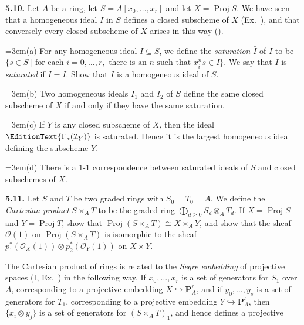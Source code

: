 {\smallskip
\noindent\hypertarget{ex-II-5.10}{}\textbf{5.10.} Let $A$ be a ring, let $S=A[x_0,\ldots,x_r]$ and let $X=\operatorname{Proj} S$. We have seen that a homogeneous ideal $I$ in $S$ defines a closed subscheme of $X$ (Ex.~), and that conversely every closed subscheme of $X$ arises in this way ().

\noindent\hangindent=3em\hspace*{1.7em}(a) For any homogeneous ideal $I\subseteq S$, we define the \emph{saturation} $\bar I$ of $I$ to be $\{s\in S\mid\text{for each }i=0,\ldots,r,\text{ there is an }n\text{ such that }x_i^ns\in I\}$. We say that $I$ is \emph{saturated} if $I=\bar I$. Show that $\bar I$ is a homogeneous ideal of $S$.

\noindent\hangindent=3em\hspace*{1.7em}(b) Two homogeneous ideals $I_1$ and $I_2$ of $S$ define the same closed subscheme of $X$ if and only if they have the same saturation.

\noindent\hangindent=3em\hspace*{1.7em}(c) If $Y$ is any closed subscheme of $X$, then the ideal $\EditionText{\Gamma_*(\mathcal I_Y)}$ is saturated. Hence it is the largest homogeneous ideal defining the subscheme $Y$.

\noindent\hangindent=3em\hspace*{1.7em}(d) There is a $1$-$1$ correspondence between saturated ideals of $S$ and closed subschemes of $X$.

\smallskip
\noindent\hypertarget{ex-II-5.11}{}\textbf{5.11.} Let $S$ and $T$ be two graded rings with $S_0=T_0=A$. We define the \emph{Cartesian product} $S\times_A T$ to be the graded ring $\bigoplus_{d\ge 0}S_d\otimes_A T_d$. If $X=\operatorname{Proj} S$ and $Y=\operatorname{Proj} T$, show that $\operatorname{Proj}(S\times_A T)\cong X\times_A Y$, and show that the sheaf $\mathcal O(1)$ on $\operatorname{Proj}(S\times_A T)$ is isomorphic to the sheaf $p_1^*(\mathcal O_X(1))\otimes p_2^*(\mathcal O_Y(1))$ on $X\times Y$.

The Cartesian product of rings is related to the \emph{Segre embedding} of projective spaces (I, Ex.~) in the following way. If $x_0,\ldots,x_r$ is a set of generators for $S_1$ over $A$, corresponding to a projective embedding $X\hookrightarrow\mathbf P_A^r$, and if $y_0,\ldots,y_s$ is a set of generators for $T_1$, corresponding to a projective embedding $Y\hookrightarrow\mathbf P_A^s$, then $\{x_i\otimes y_j\}$ is a set of generators for $(S\times_A T)_1$, and hence defines a projective}
